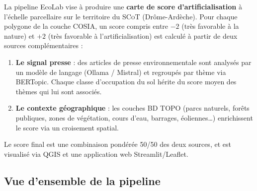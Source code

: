 \documentclass[12pt,a4paper]{report}
\newcommand{\cosia}{\textsc{COSIA}}
\newcommand{\bdtopo}{\textsc{BD TOPO}}
\newcommand{\scot}{\textsc{SCoT}}
\begin{document}
La pipeline EcoLab vise à produire une \textbf{carte de score d'artificialisation} à l'échelle parcellaire sur le territoire du \scot{} (Drôme-Ardèche). Pour chaque polygone de la couche \cosia{}, un score compris entre $-2$ (très favorable à la nature) et $+2$ (très favorable à l'artificialisation) est calculé à partir de deux sources complémentaires :

\begin{enumerate}
  \item \textbf{Le signal presse} : des articles de presse environnementale sont analysés par un modèle de langage (Ollama / Mistral) et regroupés par thème via BERTopic. Chaque classe d'occupation du sol hérite du score moyen des thèmes qui lui sont associés.
  \item \textbf{Le contexte géographique} : les couches \bdtopo{} (parcs naturels, forêts publiques, zones de végétation, cours d'eau, barrages, éoliennes…) enrichissent le score via un croisement spatial.
\end{enumerate}

Le score final est une combinaison pondérée 50/50 des deux sources, et est visualisé via QGIS et une application web Streamlit/Leaflet.

\subsection{Vue d'ensemble de la pipeline}
\end{document}
